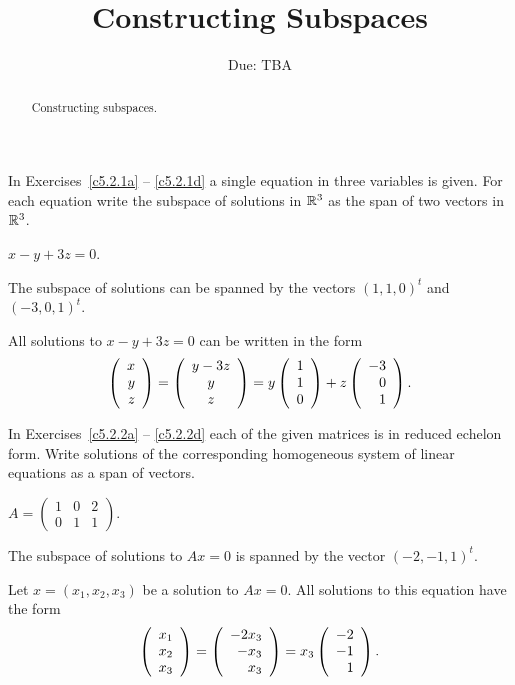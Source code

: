 \documentclass{ximera}
\title{Constructing Subspaces}
\author{\phantom{Dr. Golubitsky}}
\date{Due: TBA}
\begin{document}
\begin{abstract}
Constructing subspaces.
\end{abstract}
\maketitle



\problemlabel

\noindent In Exercises~\ref{c5.2.1a} -- \ref{c5.2.1d} a single equation in
three variables is given.  For each equation write the subspace of solutions
in ${\mathbb R}^3$ as the span of two vectors in ${\mathbb R}^3$.


\begin{exercise} \label{c5.2.1b}
$x - y + 3z = 0$.

\begin{solution}
\ans The subspace of solutions can be spanned by the vectors 
$(1,1,0)^t$ and $(-3,0,1)^t$.

\soln All solutions to $x - y + 3z = 0$ can be written in the form
\[
\left(\begin{array}{r} x \\ y \\ z\end{array}\right) = \left(\begin{array}{c} y-3z \\ y \\ z\end{array}\right)
= y\left(\begin{array}{r} 1 \\ 1 \\ 0\end{array}\right) + z\left(\begin{array}{r} -3 \\ 0 \\ 1\end{array}\right).
\]

\end{solution}
\end{exercise}




\problemlabel

\noindent In Exercises~\ref{c5.2.2a} -- \ref{c5.2.2d} each of the
given matrices is in reduced echelon form.  Write solutions of the
corresponding homogeneous system of linear equations as a span of vectors.


\begin{exercise} \label{c5.2.2c}
$A = \left(\begin{array}{rrr} 1 & 0 & 2 \\
        0 & 1 & 1\end{array}\right)$.

\begin{solution}

\ans The subspace of solutions to $Ax = 0$ is spanned by the vector
$(-2,-1,1)^t$.

\soln Let $x = (x_1,x_2,x_3)$ be a solution to $Ax = 0$.  All solutions
to this equation have the form
\[
\left(\begin{array}{r} x_1 \\ x_2 \\ x_3\end{array}\right) = \left(\begin{array}{r} -2x_3 \\ -x_3 \\ x_3\end{array}\right) =
x_3\left(\begin{array}{r} -2 \\ -1 \\ 1\end{array}\right).
\]

\end{solution}
\end{exercise}
\end{document}
